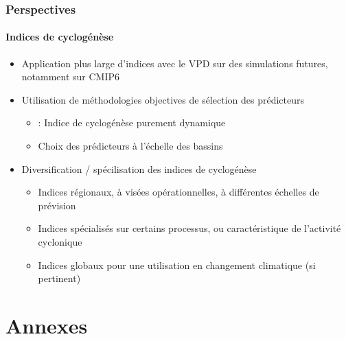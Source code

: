 \documentclass[aspectratio=169, usepdftitle=false, xcolor={dvipsnames}, 9pt,table]{beamer}
\begin{document}
\begin{frame}[c]
    \frametitle{Perspectives}
    \framesubtitle{Indices de cyclogénèse}
    \begin{block}
        \small
        \begin{itemize}
            \setlength{\itemsep}{2ex}
            \item<1-> Application plus large d'indices avec le VPD sur des simulations futures, notamment sur CMIP6
            \item<2-> Utilisation de méthodologies objectives de sélection des prédicteurs
                \begin{itemize}
                    \item \cite{wang_dynamic_2020,murakami_patterns_2022} : Indice de cyclogénèse purement dynamique
                    \item Choix des prédicteurs à l'échelle des bassins
                \end{itemize}
            \item<3-> Diversification / spécilisation des indices de cyclogénèse
                \begin{itemize}
                    \item Indices régionaux, à visées opérationnelles, à différentes échelles de prévision
                    \item Indices spécialisés sur certains processus, ou caractéristique de l'activité cyclonique
                    \item Indices globaux pour une utilisation en changement climatique (si pertinent)
                \end{itemize}
        \end{itemize}
    \end{block}
\end{frame}

\makethankyouslide

%

\appendix
\section*{Annexes}
\end{document}

